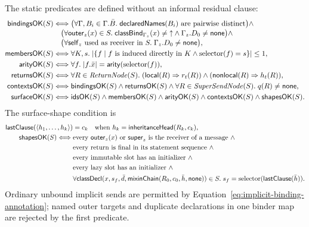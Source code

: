 The static predicates are defined without an informal residual clause:
\begin{equation}\label{eq:static-well-formedness-components}
\begin{aligned}
 \mathsf{bindingsOK}(S)&\Longleftrightarrow
   \bigl(\forall\Gamma,B_i\in\Gamma.\bar B.\;
      \mathsf{declaredNames}(B_i)\text{ are pairwise distinct}\bigr)\land\\[-1mm]
 &\quad\bigl(\forall\mathsf{outer}_{z}(x)\in S.\;
      \mathsf{classBind}_{\Gamma_z}(x)\ne\mathord{\uparrow}\land
      \Gamma_z.D_0\ne\mathsf{none}\bigr)\land\\[-1mm]
 &\quad\bigl(\forall\mathsf{self}_{z}\text{ used as receiver in }S.\;
      \Gamma_z.D_0\ne\mathsf{none}\bigr),\\
 \mathsf{membersOK}(S)&\Longleftrightarrow
   \forall K,s.\;|\{f\mid f\text{ is induced directly in }K\land
                         \mathop{\mathrm{selector}}(f)=s\}|\le1,\\
 \mathsf{arityOK}(S)&\Longleftrightarrow
   \forall f.\;|f.\bar x|=\mathsf{arity}(\mathop{\mathrm{selector}}(f)),\\
 \mathsf{returnsOK}(S)&\Longleftrightarrow
   \forall R\in\mathit{ReturnNode}(S).\;
   (\mathsf{local}(R)\Rightarrow r_t(R))\land
   (\mathsf{nonlocal}(R)\Rightarrow h_t(R)),\\
 \mathsf{contextsOK}(S)&\Longleftrightarrow
   \mathsf{bindingsOK}(S)\land\mathsf{returnsOK}(S)\land
   \forall R\in\mathit{SuperSendNode}(S).\;q(R)\ne\mathsf{none},\\
 \mathsf{surfaceOK}(S)&\Longleftrightarrow
   \mathsf{idsOK}(S)\land\mathsf{membersOK}(S)\land
   \mathsf{arityOK}(S)\land\mathsf{contextsOK}(S)\land
   \mathsf{shapesOK}(S).
\end{aligned}
\end{equation}
The surface-shape condition is
\begin{equation}\label{eq:surface-context-validity}
\begin{split}
 \mathsf{lastClause}
  (\langle h_1,\ldots,h_k\rangle)&=c_k
   \quad\text{when }h_k=\mathsf{inheritanceHead}(R_k,c_k),\\
 \mathsf{shapesOK}(S)\Longleftrightarrow{}&
  \text{every }\mathsf{outer}_{z}(x)\text{ or }\mathsf{super}_{z}
     \text{ is the receiver of a message}\ \land\\
 &\text{every return is final in its statement sequence}\ \land\\
 &\text{every immutable slot has an initializer}\ \land\\
 &\text{every lazy slot has an initializer}\ \land\\
 &\forall\mathsf{classDecl}(x,s_f,\bar d,
       \mathsf{mixinChain}(R_0,c_0,\bar h,\mathsf{none}))\in S.\;
       s_f=\mathop{\mathrm{selector}}(\mathsf{lastClause}(\bar h)).
\end{split}
\end{equation}
Ordinary unbound implicit sends are permitted by
Equation~\eqref{eq:implicit-binding-annotation}; named outer targets and
duplicate declarations in one binder map are rejected by the first predicate.

